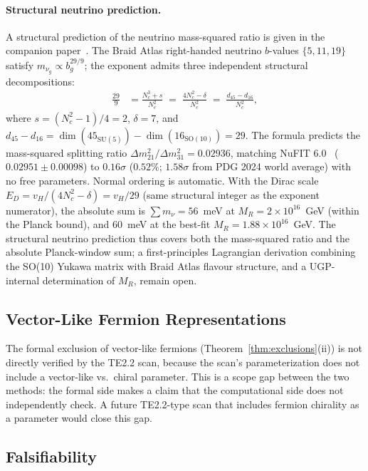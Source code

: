 \documentclass[11pt,twocolumn]{article}
\theoremstyle{remark}
\begin{document}
\paragraph{Structural neutrino prediction.}
A structural prediction of the neutrino mass-squared ratio is given in the companion paper~\cite{Spivack2026_SM_UGP}.  The Braid Atlas right-handed neutrino $b$-values $\{5,11,19\}$ satisfy $m_{\nu_g} \propto b_g^{29/9}$; the exponent admits three independent structural decompositions:
\begin{align*}
\tfrac{29}{9} &= \tfrac{N_c^3 + s}{N_c^2} \;=\; \tfrac{4N_c^2 - \delta}{N_c^2} \;=\; \tfrac{d_{45} - d_{16}}{N_c^2},
\end{align*}
where $s = (N_c^2{-}1)/4 = 2$, $\delta = 7$, and $d_{45} - d_{16} = \dim(45_{\mathrm{SU}(5)}) - \dim(16_{\mathrm{SO}(10)}) = 29$.
The formula predicts the mass-squared splitting ratio $\Delta m^2_{21}/\Delta m^2_{31} = 0.02936$, matching NuFIT 6.0~\cite{NuFIT60} ($0.02951 \pm 0.00098$) to $0.16\sigma$ ($0.52\%$; $1.58\sigma$ from PDG 2024 world average) with no free parameters.  Normal ordering is automatic.  With the Dirac scale $E_D = v_H/(4N_c^2 - \delta) = v_H/29$ (same structural integer as the exponent numerator), the absolute sum is $\sum m_\nu = 56$~meV at $M_R = 2 \times 10^{16}$~GeV (within the Planck bound), and $60$~meV at the best-fit $M_R = 1.88 \times 10^{16}$~GeV.  The structural neutrino prediction thus covers both the mass-squared ratio and the absolute Planck-window sum; a first-principles Lagrangian derivation combining the SO(10) Yukawa matrix with Braid Atlas flavour structure, and a UGP-internal determination of $M_R$, remain open.

\subsection{Vector-Like Fermion Representations}
\label{sec:vl}

The formal exclusion of vector-like fermions
(Theorem~\ref{thm:exclusions}(ii)) is not directly verified by the
TE2.2 scan, because the scan's parameterization does not include
a vector-like vs.\ chiral parameter.
This is a scope gap between the two methods: the formal side makes a
claim that the computational side does not independently check.
A future TE2.2-type scan that includes fermion chirality as a
parameter would close this gap.

\subsection{Falsifiability}
\label{sec:falsifiability}
\end{document}
